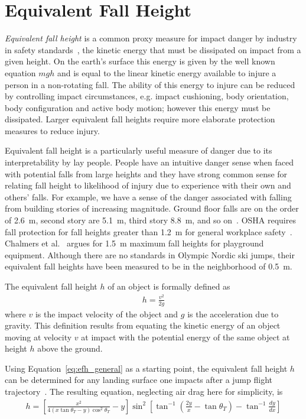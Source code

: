 \documentclass{article}
\begin{document}
\section{Equivalent Fall Height}
%
\emph{Equivalent fall height} is a common proxy measure for impact danger by
industry in safety standards~\cite{Hubbard2012}, the kinetic energy that must
be dissipated on impact from a given height. On the earth's surface this energy
is given by the well known equation $mgh$ and is equal to the linear kinetic
energy available to injure a person in a non-rotating fall. The ability of this
energy to injure can be reduced by controlling impact circumstances, e.g.
impact cushioning, body orientation, body configuration and active body motion;
however this energy must be dissipated. Larger equivalent fall heights require
more elaborate protection measures to reduce injury.

Equivalent fall height is a particularly useful measure of danger due to its
interpretability by lay people. People have an intuitive danger sense when
faced with potential falls from large heights and they have strong common sense
for relating fall height to likelihood of injury due to experience with their
own and others' falls. For example, we have a sense of the danger associated
with falling from building stories of increasing magnitude. Ground floor falls
are on the order of 2.6~\si{\meter}, second story are 5.1~\si{\meter}, third
story 8.8~\si{\meter}, and so on~\cite{Vish2005}. OSHA requires fall protection
for fall heights greater than 1.2~\si{\meter} for general workplace
safety~\cite{OSHA2021}. Chalmers et al.~\cite{Chalmers1996} argues for
1.5~\si{\meter} maximum fall heights for playground equipment. Although there
are no standards in Olympic Nordic ski jumps, their equivalent fall heights have been measured to be in the neighborhood of 0.5~\si{\meter}.

The equivalent fall height $h$ of an object is formally defined as
%
\begin{align} h = \frac{v^2}{2g} \label{eq:efh_general} \end{align}
%
where $v$ is the impact velocity of the object and $g$ is the acceleration due
to gravity. This definition results from equating the kinetic energy of an
object moving at velocity $v$ at impact with the potential energy of the same
object at height $h$ above the ground.

Using Equation~\ref{eq:efh_general} as a starting point, the equivalent fall
height $h$ can be determined for any landing surface one impacts after a jump
flight trajectory~\cite{Petrone2017}. The resulting equation, neglecting air
drag here for simplicity, is
%
\begin{align}
  h = \left[\frac{x^2}{4(x\tan\theta_T - y)\cos^{2}\theta_T} -
    y\right]\sin^{2}\left[\tan^{-1}\left(\frac{2y}{x}- \tan\theta_T\right) -
    \tan^{-1}\frac{dy}{dx}\right]
  \label{eq:efh}
\end{align}
\end{document}

